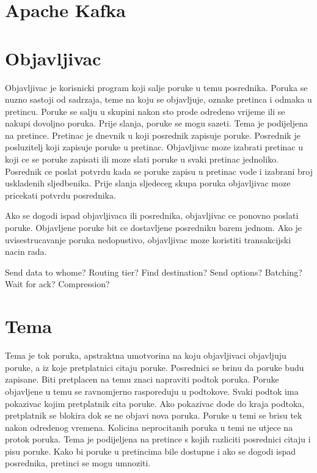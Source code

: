 \documentclass[times, utf8, diplomski, numeric]{fer}
\begin{document}
\chapter{Apache Kafka}



\chapter{Objavljivac}
Objavljivac je korisnicki program koji salje poruke u temu posrednika. Poruka se nuzno sastoji od sadrzaja, teme na koju se objavljuje, oznake pretinca i odmaka u pretincu. Poruke se salju u skupini nakon sto prode odredeno vrijeme ili se nakupi dovoljno poruka. Prije slanja, poruke se mogu sazeti. Tema je podijeljena na pretince. Pretinac je dnevnik u koji posrednik zapisuje poruke. Posrednik je posluzitelj koji zapisuje poruke u pretinac. Objavljivac moze izabrati pretinac u koji ce se poruke zapisati ili moze slati poruke u svaki pretinac jednoliko. Posrednik ce poslat potvrdu kada se poruke zapisu u pretinac vode i izabrani broj uskladenih sljedbenika. Prije slanja sljedeceg skupa poruka objavljivac moze pricekati potvrdu posrednika. 

Ako se dogodi ispad objavljivaca ili posrednika, objavljivac ce ponovno poslati poruke. Objavljene poruke bit ce dostavljene posredniku barem jednom. Ako je uvisestrucavanje poruka nedopustivo, objavljivac moze koristiti transakcijski nacin rada. 

Send data to whome?
Routing tier?
Find destination?
Send options?
Batching?
Wait for ack?
Compression?


\chapter{Tema}
Tema je tok poruka, apstraktna umotvorina na koju objavljivaci objavljuju poruke, a iz koje pretplatnici citaju poruke. Posrednici se brinu da poruke budu zapisane. Biti pretplacen na temu znaci napraviti podtok poruka. Poruke objavljene u temu se ravnomjerno rasporeduju u podtokove. Svaki podtok ima pokazivac kojim pretplatnik cita poruke. Ako pokazivac dode do kraja podtoka, pretplatnik se blokira dok se ne objavi nova poruka. Poruke u temi se brisu tek nakon odredenog vremena. Kolicina neprocitanih poruka u temi ne utjece na protok poruka. Tema je podijeljena na pretince s kojih razliciti posrednici citaju i pisu poruke. Kako bi poruke u pretincima bile dostupne i ako se dogodi ispad posrednika, pretinci se mogu umnoziti.
\end{document}
